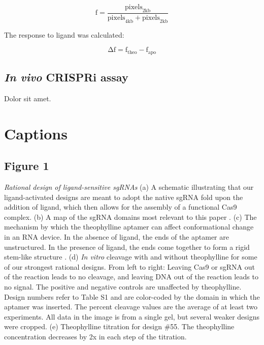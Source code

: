 \documentclass{article}
\newcommand\captitle{\textit}
\begin{document}
\begin{displaymath}
 \mathrm{f} = \frac{\mathrm{pixels}_\mathrm{2kb}}{\mathrm{pixels}_\mathrm{4kb} 
 + \mathrm{pixels}_\mathrm{2kb}}
\end{displaymath}

The response to ligand was calculated: 

\begin{displaymath}
 \mathrm{Δf} = \mathrm{f}_\mathrm{theo} - \mathrm{f}_\mathrm{apo}
\end{displaymath}

\subsection{\emph{In vivo} CRISPRi assay}

Dolor sit amet.

\section{Captions}

\subsection{Figure 1}

\captitle{Rational design of ligand-sensitive sgRNAs}
(a) A schematic illustrating that our ligand-activated designs are meant to 
adopt the native sgRNA fold upon the addition of ligand, which then allows 
for the assembly of a functional Cas9 complex.
(b) A map of the sgRNA domains most relevant to this paper 
\autocite{briner2014}.
(c) The mechanism by which the theophylline aptamer can affect conformational 
change in an RNA device.  In the absence of ligand, the ends of the aptamer 
are unstructured.  In the presence of ligand, the ends come together to form 
a rigid stem-like structure \autocite{zimmerman1997}.
(d) \emph{In vitro} cleavage with and without theophylline for some of our 
strongest rational designs.  From left to right: Leaving Cas9 or sgRNA out of 
the reaction leads to no cleavage, and leaving DNA out of the reaction leads 
to no signal.  The positive and negative controls are unaffected by 
theophylline.  Design numbers refer to Table S1 and are color-coded by the 
domain in which the aptamer was inserted.  The percent cleavage values are 
the average of at least two experiments.  All data in the image is from a 
single gel, but several weaker designs were cropped.
(e) Theophylline titration for design \#55.  The theophylline concentration 
decreases by 2x in each step of the titration.
\end{document}
